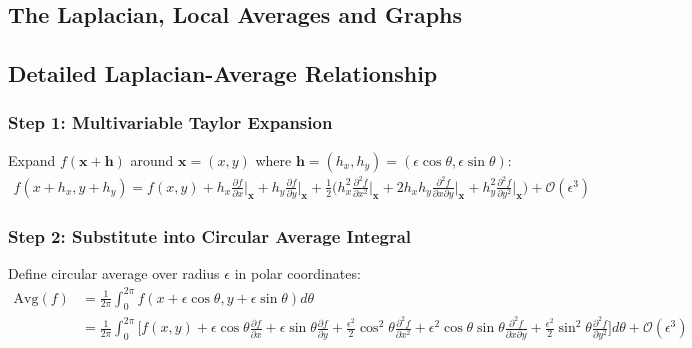\begin{notechapter}
\chapter{The Laplacian, Local Averages and Graphs}\label{ch:laplacian-average}

\section{Detailed Laplacian-Average Relationship}

\subsection{Step 1: Multivariable Taylor Expansion}
Expand $f(\mathbf{x} + \mathbf{h})$ around $\mathbf{x} = (x,y)$ where 
$\mathbf{h} = (h_x, h_y) = (\epsilon \cos\theta, \epsilon \sin\theta)$:
%
\begin{align*}
f(x + h_x, y + h_y) 
    = f(x,y) 
    + h_x \frac{\partial f}{\partial x}\bigg|_{\mathbf{x}} 
    + h_y \frac{\partial f}{\partial y}\bigg|_{\mathbf{x}}
    + \frac{1}{2}\biggl(
        h_x^2 \frac{\partial^2 f}{\partial x^2}\bigg|_{\mathbf{x}} 
        + 2h_x h_y \frac{\partial^2 f}{\partial x \partial y}\bigg|_{\mathbf{x}}
        + h_y^2 \frac{\partial^2 f}{\partial y^2}\bigg|_{\mathbf{x}} 
    \biggr) 
    + \mathcal{O}(\epsilon^3)
\end{align*}

\subsection{Step 2: Substitute into Circular Average Integral}
Define circular average over radius $\epsilon$ in polar coordinates:
%
\begin{align*}
\text{Avg}(f) 
    &= \frac{1}{2\pi} \int_0^{2\pi} f(x+\epsilon \cos\theta, y+\epsilon \sin\theta) d\theta \\
    &= \frac{1}{2\pi} \int_0^{2\pi} \biggl[
        f(x,y) 
        + \epsilon \cos\theta \frac{\partial f}{\partial x} 
        + \epsilon \sin\theta \frac{\partial f}{\partial y} 
        + \frac{\epsilon^2}{2}\cos^2\theta \frac{\partial^2 f}{\partial x^2}
        + \epsilon^2 \cos\theta \sin\theta \frac{\partial^2 f}{\partial x \partial y} 
        + \frac{\epsilon^2}{2}\sin^2\theta \frac{\partial^2 f}{\partial y^2} 
    \biggr] d\theta 
    + \mathcal{O}(\epsilon^3)
\end{align*}


\end{notechapter}
